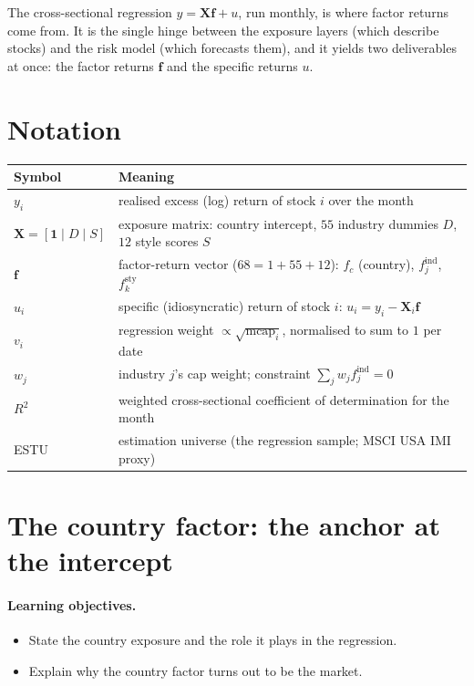 \documentclass[11pt]{article}
\theoremstyle{definition}
\theoremstyle{plain}
\theoremstyle{remark}
\newcommand{\Xmat}{\mathbf{X}}
\newcommand{\fvec}{\mathbf{f}}
\begin{document}
\begin{keyresult}
The cross-sectional regression $y=\Xmat\fvec+u$, run monthly, is where factor returns come from. It is the single hinge between the exposure layers (which describe stocks) and the risk model (which forecasts them), and it yields two deliverables at once: the factor returns $\fvec$ and the specific returns $u$.
\end{keyresult}

\section*{Notation}

\begin{center}
\begin{tabular}{@{}ll@{}}
\toprule
Symbol & Meaning \\
\midrule
$y_i$ & realised excess (log) return of stock $i$ over the month \\
$\Xmat=[\mathbf{1}\mid D\mid S]$ & exposure matrix: country intercept, $55$ industry dummies $D$, $12$ style scores $S$ \\
$\fvec$ & factor-return vector ($68 = 1+55+12$): $f_c$ (country), $f^{\text{ind}}_j$, $f^{\text{sty}}_k$ \\
$u_i$ & specific (idiosyncratic) return of stock $i$: $u_i = y_i - \Xmat_i\fvec$ \\
$v_i$ & regression weight $\propto \sqrt{\text{mcap}_i}$, normalised to sum to $1$ per date \\
$w_j$ & industry $j$'s cap weight; constraint $\sum_j w_j f^{\text{ind}}_j = 0$ \\
$R^2$ & weighted cross-sectional coefficient of determination for the month \\
ESTU & estimation universe (the regression sample; MSCI USA IMI proxy) \\
\bottomrule
\end{tabular}
\end{center}

\section{The country factor: the anchor at the intercept}\label{sec:country}

\paragraph{Learning objectives.}
\begin{itemize}[leftmargin=1.4em,topsep=2pt]
  \item State the country exposure and the role it plays in the regression.
  \item Explain why the country factor turns out to be the market.
\end{itemize}
\end{document}
